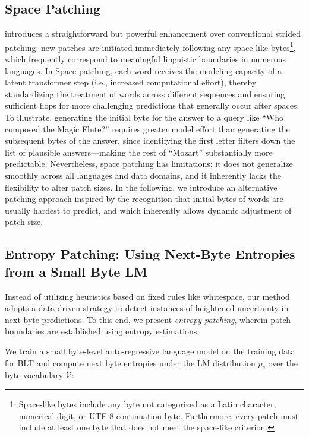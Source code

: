 \subsection{Space Patching}
\label{section:white-patch}

\citet{slagle2024spacebyte} introduces a straightforward but powerful enhancement over conventional strided patching: new patches are initiated immediately following any space-like bytes\footnote{
    Space-like bytes include any byte not categorized as a Latin character, numerical digit, or UTF-8 continuation byte. Furthermore, every patch must include at least one byte that does not meet the space-like criterion.}, which frequently correspond to meaningful linguistic boundaries in numerous languages. In Space patching, each word receives the modeling capacity of a latent transformer step (i.e., increased computational effort), thereby standardizing the treatment of words across different sequences and ensuring sufficient flops for more challenging predictions that generally occur after spaces. To illustrate, generating the initial byte for the answer to a query like ``Who composed the Magic Flute?\uline{\hspace{.6em}}'' requires greater model effort than generating the subsequent bytes of the answer, since identifying the first letter filters down the list of plausible answers—making the rest of ``Mozart'' substantially more predictable. Nevertheless, space patching has limitations: it does not generalize smoothly across all languages and data domains, and it inherently lacks the flexibility to alter patch sizes. In the following, we introduce an alternative patching approach inspired by the recognition that initial bytes of words are usually hardest to predict, and which inherently allows dynamic adjustment of patch size.

\subsection{Entropy Patching: Using Next-Byte Entropies from a Small Byte LM}
\label{section:dyn-patch}

Instead of utilizing heuristics based on fixed rules like whitespace, our method adopts a data-driven strategy to detect instances of heightened uncertainty in next-byte predictions. To this end, we present \textit{entropy patching}, wherein patch boundaries are established using entropy estimations.

We train a small byte-level auto-regressive language model on the training data for {\textsc BLT} and compute next byte entropies under the LM distribution $p_{e}$ over the byte vocabulary $\mathcal{V}$:

